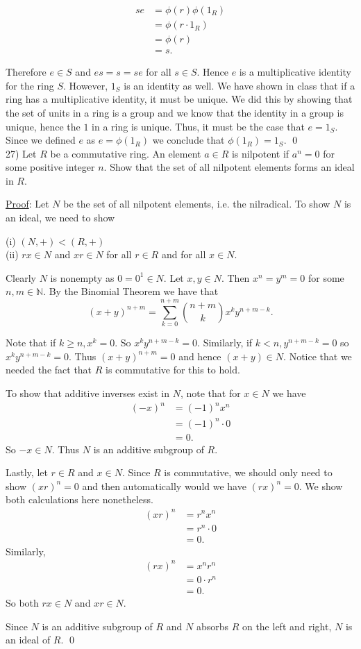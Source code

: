 \documentclass{article}
\begin{document}
\begin{align*}
	se &= \phi(r) \phi(1_R) \\
	&= \phi(r \cdot 1_R) \\
	&= \phi(r) \\
	&= s.
\end{align*}

Therefore $e \in S$ and $es = s = se$ for all $s \in S$. Hence $e$ is a multiplicative identity for the ring $S$. However, $1_S$ is an identity as well. We have shown in class that if a ring has a multiplicative identity, it must be unique. We did this by showing that the set of units in a ring is a group and we know that the identity in a group is unique, hence the $1$ in a ring is unique. Thus, it must be the case that $e = 1_S$. Since we defined $e$ as $e = \phi(1_R)$ we conclude that $\phi(1_R) = 1_S$. \qed \\

27) Let $R$ be a commutative ring. An element $a \in R$ is nilpotent if $a^n = 0$ for some positive integer $n$. Show that the set of all nilpotent elements forms an ideal in $R$. 

\underline{Proof}: Let $N$ be the set of all nilpotent elements, i.e. the nilradical. To show $N$ is an ideal, we need to show

(i) $(N, +) < (R, +)$ \\
(ii) $rx \in N$ and $xr \in N$ for all $r \in R$ and for all $x \in N$.

Clearly $N$ is nonempty as $0 = 0^1 \in N$. Let $x, y \in N$. Then $x^n = y^m = 0$ for some $n, m \in \mathbb{N}$. By the Binomial Theorem we have that
$$ (x+y)^{n+m} = \sum_{k=0}^{n+m} { {n+m}\choose{k} } x^k y^{n+m-k}.$$

Note that if $k \geq n, x^k = 0$. So $x^ky^{n+m-k} = 0$. Similarly, if $k < n, y^{n+m-k} = 0$ so $x^ky^{n+m-k} = 0$. Thus $(x+y)^{n+m} =0$ and hence $(x+y) \in N$. Notice that we needed the fact that $R$ is commutative for this to hold.

To show that additive inverses exist in $N$, note that for $x \in N$ we have 
\begin{align*}
	(-x)^n &= (-1)^n x^n \\
	&= (-1)^n \cdot 0 \\
	&= 0.
\end{align*}
So $-x \in N$. Thus $N$ is an additive subgroup of $R$.

Lastly, let $r \in R$ and $x \in N$. Since $R$ is commutative, we should only need to show $(xr)^n = 0$ and then automatically would we have $(rx)^n = 0$. We show both calculations here nonetheless.
\begin{align*}
	(xr)^n &= r^n x^n \\
	&= r^n \cdot 0 \\
	&= 0.
\end{align*}
Similarly, 
\begin{align*}
	(rx)^n &= x^n r^n \\
	&= 0 \cdot r^n \\
	&= 0.
\end{align*}
So both $rx \in N$ and $xr \in N$.

Since $N$ is an additive subgroup of $R$ and $N$ absorbs $R$ on the left and right, $N$ is an ideal of $R$. \qed \\
\end{document}
